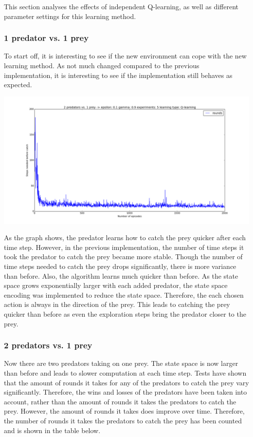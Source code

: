 This section analyses the effects of independent Q-learning, as well as different parameter settings for this learning method.
\subsubsection{1 predator vs. 1 prey}
To start off, it is interesting to see if the new environment can cope with the new learning method. As not much changed compared to the previous implementation, it is interesting to see if the implementation still behaves as expected.

\begin{center}
	\includegraphics[scale=0.3]{1_predator_1_prey_q_learning}
\end{center}

As the graph shows, the predator learns how to catch the prey quicker after each time step. However, in the previous implementation, the number of time steps it took the predator to catch the prey became more stable. Though the number of time steps needed to catch the prey drops significantly, there is more variance than before. Also, the algorithm learns much quicker than before. As the state space grows exponentially larger with each added predator, the state space encoding was implemented to reduce the state space. Therefore, the each chosen action is always in the direction of the prey. This leads to catching the prey quicker than before as even the exploration steps bring the predator closer to the prey.

\subsubsection{2 predators vs. 1 prey}
Now there are two predators taking on one prey. The state space is now larger than before and leads to slower computation at each time step. Tests have shown that the amount of rounds it takes for any of the predators to catch the prey vary significantly. Therefore, the wins and losses of the predators have been taken into account, rather than the amount of rounds it takes the predators to catch the prey. However, the amount of rounds it takes does improve over time. Therefore, the number of rounds it takes the predators to catch the prey has been counted and is shown in the table below.

